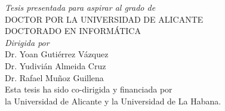 \begin{titlepage}
{ \it Tesis presentada para aspirar al grado de }\\[.25cm]
{ DOCTOR POR LA UNIVERSIDAD DE ALICANTE }\\[.25cm]
{ DOCTORADO EN INFORM{\'A}TICA }\\[0.5cm]



{ \it Dirigida por }\\[.25cm]
{ Dr. Yoan Gutiérrez Vázquez \\ Dr. Yudivián Almeida Cruz \\ Dr. Rafael Muñoz Guillena }\\[1.5cm]



{ Esta tesis ha sido co-dirigida y financiada por\\la Universidad de Alicante y la Universidad de La Habana. }



\vfill %

\end{titlepage}
